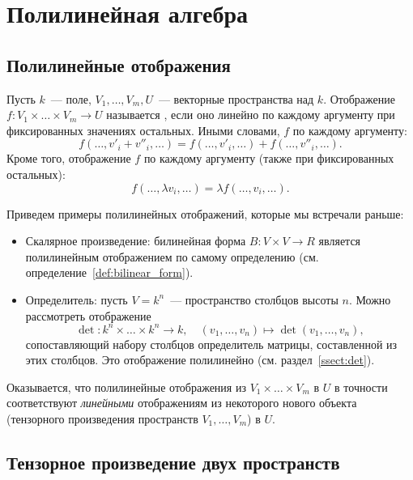 \section{Полилинейная алгебра}

\subsection{Полилинейные отображения}


Пусть $k$~--- поле, $V_1, \dots, V_m, U$~--- векторные пространства
над $k$. Отображение
$f\colon V_1\times\dots\times V_m\to U$ называется
, если оно линейно
по каждому аргументу при фиксированных значениях остальных. Иными
словами, $f$  по каждому
аргументу:
$$
f(\dots,v'_i+v''_i,\dots) =
f(\dots,v'_i,\dots) + f(\dots,v''_i,\dots).
$$
Кроме того, отображение $f$
 по каждому
аргументу (также при фиксированных остальных):
$$
f(\dots,\lambda v_i,\dots) = \lambda f(\dots,v_i,\dots).
$$

Приведем примеры полилинейных отображений, которые мы
встречали раньше:
\begin{itemize}
\item Скалярное произведение: билинейная форма
  $B\colon V\times V\to R$ является полилинейным отображением по самому
  определению (см. определение~\ref{def:bilinear_form}).
\item Определитель: пусть $V = k^n$~--- пространство столбцов высоты
  $n$. Можно рассмотреть отображение
  $$
  \det\colon k^n\times\dots\times k^n\to k,\quad
  (v_1,\dots,v_n)\mapsto\det(v_1,\dots,v_n),
  $$
  сопоставляющий набору столбцов определитель матрицы, составленной из
  этих столбцов. Это отображение полилинейно
  (см. раздел~\ref{ssect:det}).
\end{itemize}

Оказывается, что полилинейные отображения из $V_1\times\dots\times V_m$ в
$U$ в точности соответствуют {\em линейными} отображениям из
некоторого нового объекта (тензорного произведения пространств
$V_1,\dots,V_m$) в $U$.

\subsection{Тензорное произведение двух пространств}


